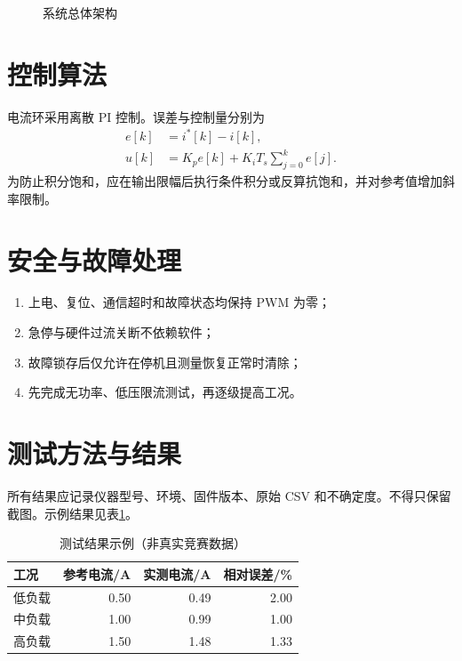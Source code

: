 \documentclass[UTF8,a4paper,12pt,fontset=fandol]{ctexart}
\begin{document}
\begin{figure}[htbp]
\centering
{}
\caption{系统总体架构}
\label{fig:architecture}
\end{figure}

\section{控制算法}
电流环采用离散 PI 控制。误差与控制量分别为
\begin{align}
  e[k] &= i^*[k]-i[k],\\
  u[k] &= K_p e[k] + K_i T_s\sum_{j=0}^{k} e[j].
\end{align}
为防止积分饱和，应在输出限幅后执行条件积分或反算抗饱和，并对参考值增加斜率限制。

\section{安全与故障处理}
\begin{enumerate}[label=\arabic*)]
  \item 上电、复位、通信超时和故障状态均保持 PWM 为零；
  \item 急停与硬件过流关断不依赖软件；
  \item 故障锁存后仅允许在停机且测量恢复正常时清除；
  \item 先完成无功率、低压限流测试，再逐级提高工况。
\end{enumerate}

\section{测试方法与结果}
所有结果应记录仪器型号、环境、固件版本、原始 CSV 和不确定度。不得只保留截图。示例结果见表\ref{tab:results}。

\begin{table}[htbp]
\centering
\caption{测试结果示例（非真实竞赛数据）}
\label{tab:results}
\begin{tabular}{lrrr}
\toprule
工况 & 参考电流/A & 实测电流/A & 相对误差/\% \\
\midrule
低负载 & 0.50 & 0.49 & 2.00 \\
中负载 & 1.00 & 0.99 & 1.00 \\
高负载 & 1.50 & 1.48 & 1.33 \\
\bottomrule
\end{tabular}
\end{table}
\end{document}
